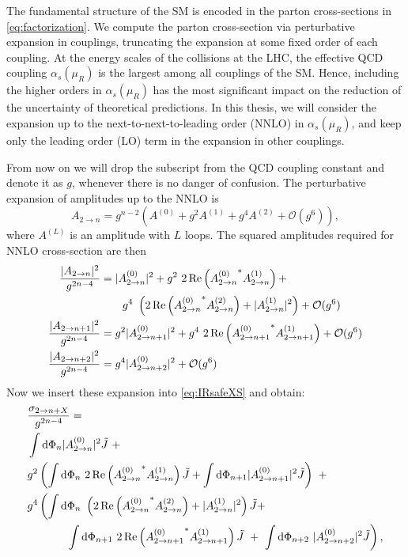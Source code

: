 The fundamental structure of the SM is encoded in the parton cross-sections  in \cref{eq:factorization}.
We compute the parton cross-section via perturbative expansion in couplings, truncating
the expansion at some fixed order of each coupling.
At the energy scales of the collisions at the LHC, the effective QCD coupling $\alpha_s(\mu_R)$ is the largest among
all couplings of the SM.
Hence, including the higher orders in  $\alpha_s(\mu_R)$ has the most significant impact on the reduction
of the uncertainty of theoretical predictions.
In this thesis, we will consider the expansion up to the next-to-next-to-leading order (NNLO) in $\alpha_s(\mu_R)$,
and keep only the leading order (LO) term in the expansion in other couplings.

From now on we will drop the subscript from the QCD coupling constant and denote it as $g$, whenever there is no danger of confusion.
The perturbative expansion of amplitudes up to the NNLO is
\begin{equation}
  \label{eq:amplitudes_expansion}
  A_{2\to n} = g^{n-2} \left( A^{(0)} + g^2 A^{(1)} + g^4 A^{(2)} + \mathcal{O}(g^{6}) \right),
\end{equation}
where $A^{(L)}$ is an amplitude with $L$ loops.
The squared amplitudes required for NNLO cross-section are then
\begin{subequations}
  \begin{align}
    \frac{\vert A_{2\to n} \vert^2}{g^{2n-4}}  &= \vert A^{(0)}_{2\to n} \vert^2 + g^2~2\Re\left({A^{(0)}_{2\to n}}^{*} A^{(1)}_{2\to n}\right) + \\ & \qquad g^4~\left(2\Re\left({A^{(0)}_{2\to n}}^{*} A^{(2)}_{2\to n}\right) + \vert A^{(1)}_{2\to n} \vert^2 \right)+ \mathcal{O}(g^{6})  \\
    \frac{\vert A_{2\to n+1} \vert^2}{g^{2n-4}} &= g^2 \vert A^{(0)}_{2\to n+1} \vert^2 + g^4~2\Re\left({A^{(0)}_{2\to n+1}}^{*} A^{(1)}_{2\to n+1}\right) + \mathcal{O}(g^{6}) \\
    \frac{\vert A_{2\to n+2} \vert^2}{g^{2n-4}} &= g^4 \vert A^{(0)}_{2\to n+2} \vert^2 + \mathcal{O}(g^{6})
  \end{align}
\end{subequations}
Now we insert these expansion into \eqref{eq:IRsafeXS} and obtain:
\begin{subequations}
  \label{eq:NNLO_xs}
  \begin{align}
    \nonumber
    & \frac{\sigma_{2\rightarrow n + X}}{g^{2n-4}} = \\
    & \int \dd\Phi_n \vert A^{(0)}_{2\to n} \vert^2 \tilde{J}  ~+ \\
    & g^{2} \left( \int \dd\Phi_n~2\Re\left({A^{(0)}_{2\to n}}^{*} A^{(1)}_{2\to n}\right) \tilde{J}  + \int \dd\Phi_{n+1} \vert A^{(0)}_{2\to n+1} \vert^2 \tilde{J} \right) ~+ \\
    & g^{4} \left( \int \dd\Phi_n~ \left( 2\Re\left({A^{(0)}_{2\to n}}^{*} A^{(2)}_{2\to n}\right) + \vert A^{(1)}_{2\to n} \vert^2 \right) \tilde{J}   + \right. \\ 
    \label{eq:RR}
    & \hspace{8ex} \left. \int \dd\Phi_{n+1}~ 2\Re\left({A^{(0)}_{2\to n+1}}^{*} A^{(1)}_{2\to n+1}\right) \tilde{J} ~+~ \int \dd\Phi_{n+2}~ \vert A^{(0)}_{2\to n+2} \vert^2 \tilde{J} \right),
  \end{align}
\end{subequations}
